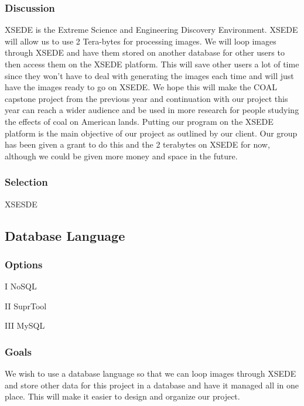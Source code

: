 \documentclass[10pt,draftclsnofoot,onecolumn,journal,compsoc]{IEEEtran}
\begin{document}
\subsubsection{Discussion}

\noindent XSEDE is the Extreme Science and Engineering Discovery Environment. XSEDE will allow us to use 2 Tera-bytes for processing images. We will loop images through XSEDE and have them stored on another database for other users to then access them on the XSEDE platform. This will save other users a lot of time since they won’t have to deal with generating the images each time and will just have the images ready to go on XSEDE. We hope this will make the COAL capstone project from the previous year and continuation with our project this year can reach a wider audience and be used in more research for people studying the effects of coal on American lands. Putting our program on the XSEDE platform is the main objective of our project as outlined by our client. Our group has been given a grant to do this and the 2 terabytes on XSEDE for now, although we could be given more money and space in the future.

\subsubsection{Selection}

\noindent XSESDE

\subsection{Database Language}

\subsubsection{Options}

\noindent I NoSQL \newline

\noindent II SuprTool \newline

\noindent III MySQL

\subsubsection{Goals}

\noindent We wish to use a database language so that we can loop images through XSEDE and store other data for this project in a database and have it managed all in one place. This will make it easier to design and organize our project.
\end{document}
